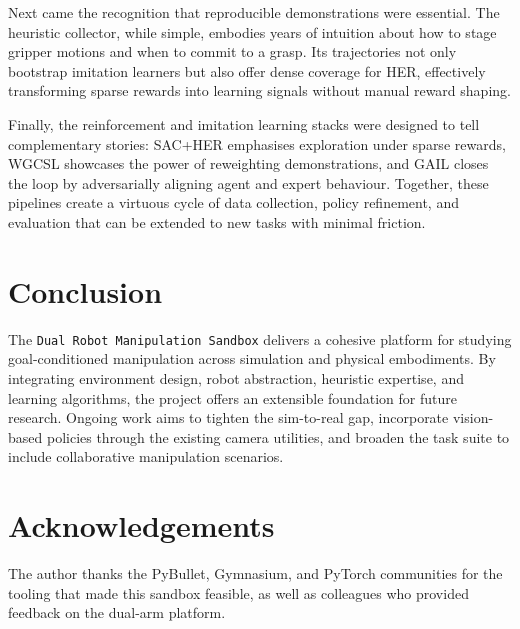 \documentclass[11pt]{article}
\begin{document}
Next came the recognition that reproducible demonstrations were essential. The heuristic collector, while simple, embodies years of intuition about how to stage gripper motions and when to commit to a grasp. Its trajectories not only bootstrap imitation learners but also offer dense coverage for HER, effectively transforming sparse rewards into learning signals without manual reward shaping.

Finally, the reinforcement and imitation learning stacks were designed to tell complementary stories: SAC+HER emphasises exploration under sparse rewards, WGCSL showcases the power of reweighting demonstrations, and GAIL closes the loop by adversarially aligning agent and expert behaviour. Together, these pipelines create a virtuous cycle of data collection, policy refinement, and evaluation that can be extended to new tasks with minimal friction.

\section{Conclusion}
The \texttt{Dual Robot Manipulation Sandbox} delivers a cohesive platform for studying goal-conditioned manipulation across simulation and physical embodiments. By integrating environment design, robot abstraction, heuristic expertise, and learning algorithms, the project offers an extensible foundation for future research. Ongoing work aims to tighten the sim-to-real gap, incorporate vision-based policies through the existing camera utilities, and broaden the task suite to include collaborative manipulation scenarios.

\section*{Acknowledgements}
The author thanks the PyBullet, Gymnasium, and PyTorch communities for the tooling that made this sandbox feasible, as well as colleagues who provided feedback on the dual-arm platform.
\end{document}
